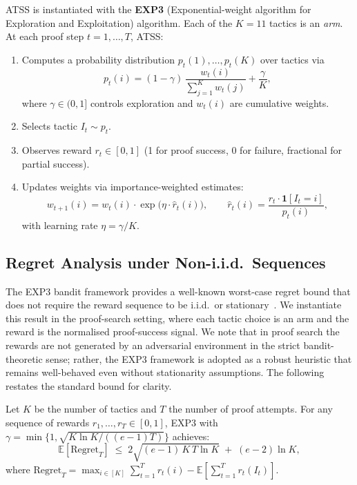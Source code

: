\documentclass[acmtocl,review,anonymous]{acmart}
\newcommand{\ATSS}{\textsc{ATSS}}
\begin{document}
\ATSS{} is instantiated with the \textbf{EXP3} (Exponential-weight
algorithm for Exploration and Exploitation) algorithm.
Each of the $K = 11$ tactics is an \emph{arm}. At each proof step
$t=1,\dots,T$, \ATSS{}:
\begin{enumerate}
  \item Computes a probability distribution
    $p_t(1),\dots,p_t(K)$ over tactics via
    \begin{equation}
      p_t(i) = (1-\gamma)\,\frac{w_t(i)}{\sum_{j=1}^{K}w_t(j)} + \frac{\gamma}{K},
      \label{eq:exp3-dist}
    \end{equation}
    where $\gamma \in (0,1]$ controls exploration and $w_t(i)$ are
    cumulative weights.
  \item Selects tactic $I_t \sim p_t$.
  \item Observes reward $r_t \in [0,1]$ (1 for proof success, 0 for
    failure, fractional for partial success).
  \item Updates weights via importance-weighted estimates:
    \begin{equation}
      w_{t+1}(i) = w_t(i) \cdot \exp\!\bigl(\eta \cdot \hat{r}_t(i)\bigr),
      \qquad
      \hat{r}_t(i) = \frac{r_t \cdot \mathbf{1}[I_t=i]}{p_t(i)},
      \label{eq:exp3-update}
    \end{equation}
    with learning rate $\eta = \gamma/K$.
\end{enumerate}

\subsection{Regret Analysis under Non-i.i.d.\ Sequences}

The EXP3 bandit framework provides a well-known worst-case regret
bound that does not require the reward sequence to be i.i.d.\ or
stationary~\cite{AuerCesaBianchiFreundSchapire2002}.  We instantiate
this result in the proof-search setting, where each tactic choice is
an arm and the reward is the normalised proof-success signal.  We note
that in proof search the rewards are not generated by an adversarial
environment in the strict bandit-theoretic sense; rather, the EXP3
framework is adopted as a robust heuristic that remains well-behaved
even without stationarity assumptions.  The following restates the
standard bound for clarity.

\begin{theorem}
  \label{thm:atss-regret}
  Let $K$ be the number of tactics and $T$ the number of proof
  attempts.  For any sequence of rewards $r_1,\dots,r_T \in [0,1]$,
  EXP3 with $\gamma = \min\{1,
  \sqrt{K\ln K / ((e-1)T)}\}$ achieves:
  \begin{equation}
    \mathbb{E}[\mathrm{Regret}_T] \;\leq\;
    2\sqrt{(e-1)\,K\,T\ln K} \;+\; (e-2)\ln K,
  \end{equation}
  where $\mathrm{Regret}_T = \max_{i\in[K]} \sum_{t=1}^{T} r_t(i) -
  \mathbb{E}[\sum_{t=1}^{T} r_t(I_t)]$.
\end{theorem}
\end{document}
